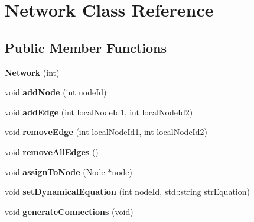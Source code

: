 \hypertarget{classNetwork}{}\section{Network Class Reference}
\label{classNetwork}
\subsection*{Public Member Functions}
\begin{DoxyCompactItemize}
\item 
{\bfseries Network} (int)\hypertarget{classNetwork_a30c34d28f6da478d4d7b597165dc95a9}{}\label{classNetwork_a30c34d28f6da478d4d7b597165dc95a9}

\item 
void {\bfseries add\+Node} (int node\+Id)\hypertarget{classNetwork_ae5cee65d8d673280142c6f1a9420b0e7}{}\label{classNetwork_ae5cee65d8d673280142c6f1a9420b0e7}

\item 
void {\bfseries add\+Edge} (int local\+Node\+Id1, int local\+Node\+Id2)\hypertarget{classNetwork_ae45cbbac2dd53ec1e1bb0c8074139d7d}{}\label{classNetwork_ae45cbbac2dd53ec1e1bb0c8074139d7d}

\item 
void {\bfseries remove\+Edge} (int local\+Node\+Id1, int local\+Node\+Id2)\hypertarget{classNetwork_a375aad913988baf7fefec77b7dd3a485}{}\label{classNetwork_a375aad913988baf7fefec77b7dd3a485}

\item 
void {\bfseries remove\+All\+Edges} ()\hypertarget{classNetwork_a900818896e85d83af131d590e68388f6}{}\label{classNetwork_a900818896e85d83af131d590e68388f6}

\item 
void {\bfseries assign\+To\+Node} (\hyperlink{classNode}{Node} $\ast$node)\hypertarget{classNetwork_a78e5489d4cf31b296366f5ccaede0fdf}{}\label{classNetwork_a78e5489d4cf31b296366f5ccaede0fdf}

\item 
void {\bfseries set\+Dynamical\+Equation} (int node\+Id, std\+::string str\+Equation)\hypertarget{classNetwork_a1e066354c2d7e40338ee2e5b3e974595}{}\label{classNetwork_a1e066354c2d7e40338ee2e5b3e974595}

\item 
void {\bfseries generate\+Connections} (void)\hypertarget{classNetwork_a2fcc69db1e696f07424a3fee766e125f}{}\label{classNetwork_a2fcc69db1e696f07424a3fee766e125f}


\end{DoxyCompactItemize}
